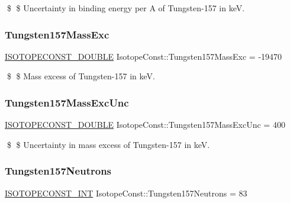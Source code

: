 \$ \$ Uncertainty in binding energy per A of Tungsten-\/157 in keV. \mbox{\label{group___isotope_const-_tungsten-_w157_gaded8f76ee062ead71479b7cab7909d35}} 
\subsubsection{\texorpdfstring{Tungsten157\+Mass\+Exc}{Tungsten157MassExc}}
{\footnotesize\ttfamily \mbox{\hyperlink{group___isotope_const-_macros_ga8f45a7272ce02c0b4c65c44636ed719a}{I\+S\+O\+T\+O\+P\+E\+C\+O\+N\+S\+T\+\_\+\+D\+O\+U\+B\+LE}} Isotope\+Const\+::\+Tungsten157\+Mass\+Exc = -\/19470}

\$ \$ Mass excess of Tungsten-\/157 in keV. \mbox{\label{group___isotope_const-_tungsten-_w157_gaa99b851807c0e2b4b61a903a082b0d4f}} 
\subsubsection{\texorpdfstring{Tungsten157\+Mass\+Exc\+Unc}{Tungsten157MassExcUnc}}
{\footnotesize\ttfamily \mbox{\hyperlink{group___isotope_const-_macros_ga8f45a7272ce02c0b4c65c44636ed719a}{I\+S\+O\+T\+O\+P\+E\+C\+O\+N\+S\+T\+\_\+\+D\+O\+U\+B\+LE}} Isotope\+Const\+::\+Tungsten157\+Mass\+Exc\+Unc = 400}

\$ \$ Uncertainty in mass excess of Tungsten-\/157 in keV. \mbox{\label{group___isotope_const-_tungsten-_w157_ga9df74d494213bf34a7e1c2f7a04705dc}} 
\subsubsection{\texorpdfstring{Tungsten157\+Neutrons}{Tungsten157Neutrons}}
{\footnotesize\ttfamily \mbox{\hyperlink{group___isotope_const-_macros_ga5f18360b3e99483a35c32d789e62621c}{I\+S\+O\+T\+O\+P\+E\+C\+O\+N\+S\+T\+\_\+\+I\+NT}} Isotope\+Const\+::\+Tungsten157\+Neutrons = 83}

